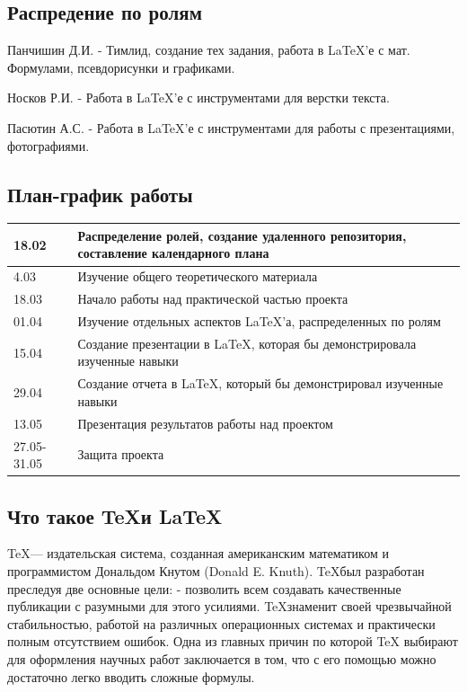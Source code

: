 \documentclass{article}
\begin{document}
\subsection*{Распредение по ролям}
Панчишин Д.И. - Тимлид, создание тех задания, работа в LaTeX’е с мат. Формулами, псевдорисунки и графиками.

\vspace{\baselineskip}
Носков Р.И. - Работа в LaTeX’е с инструментами для верстки текста.

\vspace{\baselineskip}
Пасютин А.С. - Работа в LaTeX’е с инструментами для работы с презентациями, фотографиями.

\subsection*{План-график работы}
\begin{tabular}{|l|p{12cm}|}
	\hline
	18.02 & Распределение ролей, создание удаленного репозитория, составление календарного плана \\
	\hline
	4.03 & Изучение общего теоретического материала \\
	\hline
	18.03 & Начало работы над практической частью проекта \\
	\hline
	01.04 & Изучение отдельных аспектов \LaTeX’а, распределенных по ролям \\
	\hline
	15.04 & Создание презентации в \LaTeX, которая бы демонстрировала изученные навыки \\
	\hline
	29.04 & Создание отчета в \LaTeX, который бы демонстрировал изученные навыки
	\\
	\hline
	13.05 & Презентация результатов работы над проектом \\
	\hline
	27.05-31.05 & Защита проекта \\
	\hline
\end{tabular}

\subsection*{Что такое \TeX и \LaTeX}
\TeX — издательская система, созданная американским математиком и программистом Дональдом Кнутом (Donald E. Knuth). \TeX был разработан преследуя две основные цели: - позволить всем создавать качественные публикации с разумными для этого усилиями. \TeX знаменит своей чрезвычайной стабильностью, работой на различных операционных системах и практически полным отсутствием ошибок. Одна из главных причин по которой TeX выбирают для оформления научных работ заключается в том, что с его помощью можно достаточно легко вводить сложные формулы.
\end{document}
